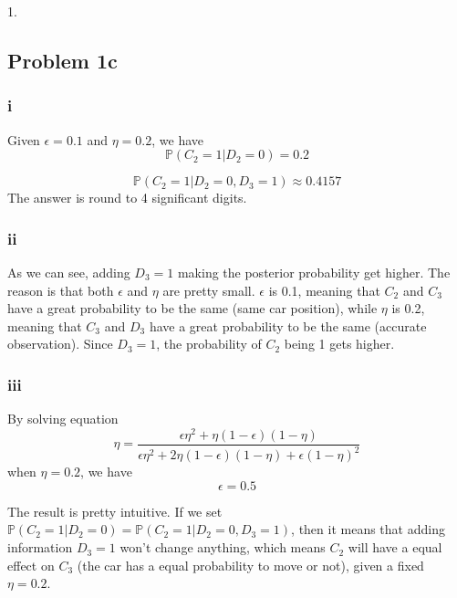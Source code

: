 \documentclass[paper=a4, fontsize=10pt]{scrartcl} %
\numberwithin{equation}{section} %
\numberwithin{figure}{section} %
\numberwithin{table}{section} %
\begin{document}
\begin{spacing}{1.}
\subsection{Problem 1c}
\subsubsection{i}
Given $\epsilon = 0.1$ and $\eta = 0.2$, we have
\begin{displaymath}
\mathbb{P}(C_{2}=1|D_{2}=0) = 0.2
\end{displaymath}

\begin{displaymath}
\mathbb{P}(C_{2}=1|D_{2}=0, D_{3}=1) \approx 0.4157
\end{displaymath}
The answer is round to 4 significant digits.

\subsubsection{ii}
As we can see, adding $D_{3} = 1$ making the posterior probability get higher. The reason is that both $\epsilon$ and $\eta$ are pretty small. $\epsilon$ is 0.1, meaning that $C_{2}$ and $C_{3}$ have a great probability to be the same (same car position), while $\eta$ is 0.2, meaning that $C_{3}$ and $D_{3}$ have a great probability to be the same (accurate observation). Since $D_{3} = 1$, the probability of $C_{2}$ being 1 gets higher.

\subsubsection{iii}
By solving equation
\begin{displaymath}
 \eta = \frac{\epsilon\eta^{2} + \eta(1-\epsilon)(1-\eta)}{\epsilon\eta^{2} + 2\eta(1-\epsilon)(1-\eta) + \epsilon(1-\eta)^{2}}
\end{displaymath}
when $\eta = 0.2$, we have
\begin{displaymath}
\epsilon = 0.5
\end{displaymath}

The result is pretty intuitive. If we set $\mathbb{P}(C_{2}=1|D_{2}=0) = \mathbb{P}(C_{2}=1|D_{2}=0, D_{3}=1)$, then it means that adding information $D_{3}=1$ won't change anything, which means $C_{2}$ will have a equal effect on $C_{3}$ (the car has a equal probability to move or not), given a fixed $\eta = 0.2$.


\end{spacing}
\end{document}
